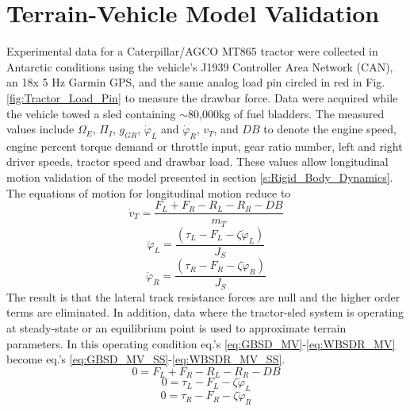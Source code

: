 \section{Terrain-Vehicle Model Validation}
Experimental data for a Caterpillar/AGCO MT865 tractor were collected in Antarctic conditions using the vehicle's J1939 Controller Area Network (CAN), an 18x 5 Hz Garmin GPS, and the same analog load pin circled in red in Fig. \ref{fig:Tractor_Load_Pin} to measure the drawbar force. Data were acquired while the vehicle towed a sled containing $\sim$80,000kg of fuel bladders. The measured values include $\Omega_E$, $\Pi_I$, $g_{GR}$, $\dot\varphi_L$  and $\dot\varphi_R$, $v_T$, and $DB$ to denote the engine speed, engine percent torque demand or throttle input, gear ratio number, left and right driver speeds, tractor speed and drawbar load. These values allow longitudinal motion validation of the model presented in section \ref{s:Rigid_Body_Dynamics}. The equations of motion for longitudinal motion reduce to
\begin{equation}\label{eq:GBSD_MV}
    \dot v_T = \frac{F_L + F_R - R_L - R_R - DB}{m_T}
\end{equation}
\begin{equation}\label{eq:WBSDL_MV}
    \ddot\varphi_L = \frac{(\tau_L - F_L - \zeta\dot\varphi_L)}{J_S}
\end{equation}
\begin{equation}\label{eq:WBSDR_MV}
    \ddot\varphi_R = \frac{(\tau_R - F_R - \zeta\dot\varphi_R)}{J_S}
\end{equation}
 The result is that the lateral track resistance forces are null and the higher order terms are eliminated. In addition, data where the tractor-sled system is operating at steady-state or an equilibrium point is used to approximate terrain parameters. In this operating condition eq.'s \ref{eq:GBSD_MV}-\ref{eq:WBSDR_MV} become eq.'s \ref{eq:GBSD_MV_SS}-\ref{eq:WBSDR_MV_SS}.
\begin{equation}\label{eq:GBSD_MV_SS}
    0 = F_L + F_R - R_L - R_R - DB
\end{equation}
\begin{equation}\label{eq:WBSDL_MV_SS}
    0 = \tau_L - F_L - \zeta\dot\varphi_L
\end{equation}
\begin{equation}\label{eq:WBSDR_MV_SS}
    0 = \tau_R - F_R - \zeta\dot\varphi_R
\end{equation}
